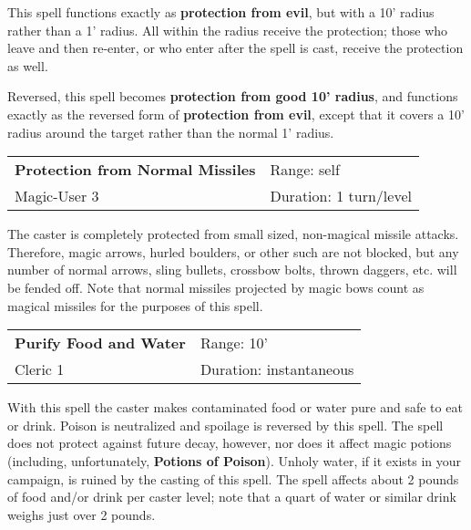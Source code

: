 \documentclass[a4paper,twoside,openany,10pt]{book}
\begin{document}
\begin{multicols}{2}
This spell functions exactly as \textbf{protection from evil}, but with a 10' radius rather than a 1' radius. All within the radius receive the protection; those who leave and then re-enter, or who enter after the spell is cast, receive the protection as well.

Reversed, this spell becomes \textbf{protection from good 10' radius}, and functions exactly as the reversed form of \textbf{protection from evil}, except that it covers a 10' radius around the target rather than the normal 1' radius.

\smallskip\begin{flushleft} 
	\begin{tabularx}{0.45\textwidth}{@{}m{4cm}m{5.5cm}@{}} 
		\textbf{Protection from Normal Missiles} & Range: self\\
Magic-User 3 & Duration: 1 turn/level\\
	\end{tabularx}\end{flushleft}

The caster is completely protected from small sized, non-magical missile attacks. Therefore, magic arrows, hurled boulders, or other such are not blocked, but any number of normal arrows, sling bullets, crossbow bolts, thrown daggers, etc. will be fended off. Note that normal missiles projected by magic bows count as magical missiles for the purposes of this spell.



\smallskip\begin{flushleft} 
	\begin{tabularx}{0.45\textwidth}{@{}m{4cm}m{5.5cm}@{}} 
		\textbf{Purify Food and Water} & Range: 10'\\
		Cleric 1 & Duration: instantaneous\\
	\end{tabularx}\end{flushleft}

With this spell the caster makes contaminated food or water pure and safe to eat or drink. Poison is neutralized and spoilage is reversed by this spell. The spell does not protect against future decay, however, nor does it affect magic potions (including, unfortunately, \textbf{Potions of Poison}). Unholy water, if it exists in your campaign, is ruined by the casting of this spell. The spell affects about 2 pounds of food and/or drink per caster level; note that a quart of water or similar drink weighs just over 2 pounds.



\end{multicols}
\end{document}
